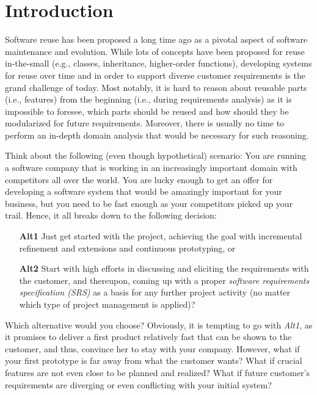 \documentclass[graybox]{svmult}
\begin{document}
\section{Introduction}
\label{sec:intro}

Software reuse has been proposed a long time ago as a pivotal aspect of software maintenance and evolution.
While lots of concepts have been proposed for reuse in-the-small (e.g., classes, inheritance, higher-order functions), developing systems for reuse over time and in order to support diverse customer requirements is the grand challenge of today.
Most notably, it is hard to reason about reusable parts (i.e., features) from the beginning (i.e., during requirements analysis) as it is impossible to foresee, which parts should be reused and how should they be modularized for future requirements. Moreover, there is usually no time to perform an in-depth domain analysis that would be necessary for such reasoning.

Think about the following (even though hypothetical) scenario: 
You are running a software company that is working in an increasingly important domain with competitors all over the world.
You are lucky enough to get an offer for developing a software system that would be amazingly important for your business, but you need to be fast enough as your competitors picked up your trail. 
Hence, it all breaks down to the following decision:
\begin{itemize}
    \item[\textbf{Alt1}] Just get started with the project, achieving the goal with incremental refinement and extensions and continuous prototyping, or
    \item[\textbf{Alt2}] Start with high efforts in discussing and eliciting the requirements with the customer, and thereupon, coming up with a proper \textit{software requirements specification (SRS)} as a basis for any further project activity (no matter which type of project management is applied)?
\end{itemize}

Which alternative would you choose?
Obviously, it is tempting to go with \textit{Alt1}, as it promises to deliver a first product relatively fast that can be shown to the customer, and thus, convince her to stay with your company.
However, what if your first prototype is far away from what the customer wants? What if crucial features are not even close to be planned and realized? What if future customer's requirements are diverging or even conflicting with your initial system?
\end{document}
